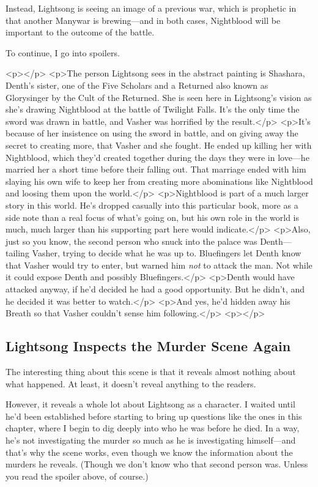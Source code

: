 Instead, Lightsong is seeing an image of a previous war, which is prophetic in that another Manywar is brewing—and in both cases, Nightblood will be important to the outcome of the battle.

To continue, I go into spoilers.



<p></p>
<p>The person Lightsong sees in the abstract painting is Shashara, Denth’s sister, one of the Five Scholars and a Returned also known as Glorysinger by the Cult of the Returned. She is seen here in Lightsong’s vision as she’s drawing Nightblood at the battle of Twilight Falls. It’s the only time the sword was drawn in battle, and Vasher was horrified by the result.</p>
<p>It’s because of her insistence on using the sword in battle, and on giving away the secret to creating more, that Vasher and she fought. He ended up killing her with Nightblood, which they’d created together during the days they were in love—he married her a short time before their falling out. That marriage ended with him slaying his own wife to keep her from creating more abominations like Nightblood and loosing them upon the world.</p>
<p>Nightblood is part of a much larger story in this world. He’s dropped casually into this particular book, more as a side note than a real focus of what’s going on, but his own role in the world is much, much larger than his supporting part here would indicate.</p>
<p>Also, just so you know, the second person who snuck into the palace was Denth—tailing Vasher, trying to decide what he was up to. Bluefingers let Denth know that Vasher would try to enter, but warned him \textit{not} to attack the man. Not while it could expose Denth and possibly Bluefingers.</p>
<p>Denth would have attacked anyway, if he’d decided he had a good opportunity. But he didn’t, and he decided it was better to watch.</p>
<p>And yes, he’d hidden away his Breath so that Vasher couldn’t sense him following.</p>
<p></p>

\subsection*{Lightsong Inspects the Murder Scene Again}

The interesting thing about this scene is that it reveals almost nothing about what happened. At least, it doesn’t reveal anything to the readers.

However, it reveals a whole lot about Lightsong as a character. I waited until he’d been established before starting to bring up questions like the ones in this chapter, where I begin to dig deeply into who he was before he died. In a way, he’s not investigating the murder so much as he is investigating himself—and that’s why the scene works, even though we know the information about the murders he reveals. (Though we don’t know who that second person was. Unless you read the spoiler above, of course.)



